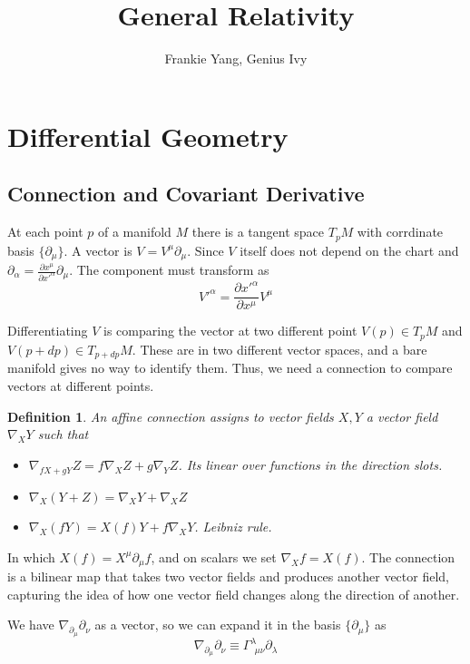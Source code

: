 \documentclass{article}
\title{General Relativity}
\author{Frankie Yang, Genius Ivy}
\date{}
\newtheorem{definition}{Definition}[section]
\begin{document}
\maketitle

\tableofcontents
\newpage
\section{Differential Geometry}

 \subsection{Connection and Covariant Derivative}
At each point $p$ of a manifold $M$ there is a tangent space $T_pM$ with corrdinate basis $\{\partial_\mu\}$. A vector is $V=V^\mu \partial_\mu$. Since $V$ itself does not depend on the chart and $\partial_\alpha = \frac{\partial x^\mu}{\partial x'^\alpha}\partial_\mu$. The component must transform as
\begin{equation}
    V'^\alpha = \frac{\partial x'^\alpha}{\partial x^\mu}V^\mu
\end{equation}

Differentiating $V$ is comparing the vector at two different point $V(p)\in T_pM $ and $V(p+dp) \in T_{p+dp}M$. These are in two different vector spaces, and a bare manifold gives no way to identify them. Thus, we need a connection to compare vectors at different points.
\begin{definition}
An affine connection assigns to vector fields $X,Y$ a vector field $\nabla _X Y$ such that
\begin{itemize}
    \item $\nabla_{fX+gY} Z= f\nabla_XZ + g\nabla_Y Z$. Its linear over functions in the direction slots.
    \item $\nabla_X(Y+Z) = \nabla_X Y + \nabla_X Z$
    \item $\nabla_X(fY) = X(f)Y + f\nabla_X Y$. Leibniz rule.
\end{itemize}
\end{definition}

In which $X(f) = X^\mu \partial_\mu f$, and on scalars we set $\nabla_X f = X(f)$. The connection is a bilinear map that takes two vector fields and produces another vector field, capturing the idea of how one vector field changes along the direction of another.

We have $\nabla _{\partial_\mu}\partial_\nu$ as a vector, so we can expand it in the basis $\{\partial_\mu\}$ as
\begin{equation}
    \nabla_{\partial_\mu}\partial_\nu \equiv \Gamma^\lambda_{~~\mu\nu} \partial_\lambda
\end{equation}
\end{document}
